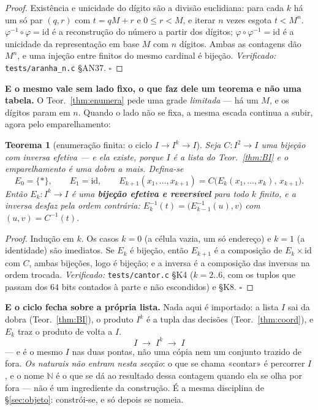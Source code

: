 \documentclass[11pt,a4paper]{article}
\newcommand{\code}[1]{\texttt{\small #1}}
\newtheorem{teorema}{Teorema}
\begin{document}
\begin{proof}
Existência e unicidade do dígito são a divisão euclidiana: para cada $k$ há um só
par $(q,r)$ com $t=qM+r$ e $0\le r<M$, e iterar $n$ vezes esgota $t<M^{n}$.
$\varphi^{-1}\circ\varphi=\mathrm{id}$ é a reconstrução do número a partir dos
dígitos; $\varphi\circ\varphi^{-1}=\mathrm{id}$ é a unicidade da representação em
base $M$ com $n$ dígitos. Ambas as contagens dão $M^{n}$, e uma injeção entre
finitos do mesmo cardinal é bijeção. \emph{Verificado:}
\code{tests/aranha\_n.c} §AN37. $\square$
\end{proof}

\medskip\noindent\textbf{E o mesmo vale sem lado fixo, o que faz dele um teorema e
não uma tabela.} O Teor.~\ref{thm:enumera} pede uma grade \emph{limitada} --- há um
$M$, e os dígitos param em $n$. Quando o lado não se fixa, a mesma escada continua a
subir, agora pelo emparelhamento:

\begin{teorema}[enumeração finita: o ciclo $I\to I^{k}\to I$]\label{thm:enumfin}
Seja $C\colon I^2\to I$ uma bijeção com inversa efetiva --- e ela existe, porque
$I$ é a lista do Teor.~\ref{thm:BI} e o emparelhamento é uma dobra a mais. Defina-se
\[
E_0=\{\ast\},\qquad E_1=\mathrm{id},\qquad
E_{k+1}(x_1,\dots,x_{k+1})=C\bigl(E_k(x_1,\dots,x_k),\,x_{k+1}\bigr).
\]
Então $E_k\colon I^{k}\to I$ é uma \textbf{bijeção efetiva e reversível} para todo
$k$ finito, e a inversa desfaz \emph{pela ordem contrária}:
$E_k^{-1}(t)=\bigl(E_{k-1}^{-1}(u),v\bigr)$ com $(u,v)=C^{-1}(t)$.
\end{teorema}

\begin{proof}
Indução em $k$. Os casos $k=0$ (a célula vazia, um só endereço) e $k=1$ (a
identidade) são imediatos. Se $E_k$ é bijeção, então $E_{k+1}$ é a composição de
$E_k\times\mathrm{id}$ com $C$, ambas bijeções, logo é bijeção; e a inversa é a
composição das inversas na ordem trocada. \emph{Verificado:}
\code{tests/cantor.c} §K4 ($k=2..6$, com os tuplos que passam dos $64$ bits contados
à parte e não escondidos) e §K8. $\square$
\end{proof}

\medskip\noindent\textbf{E o ciclo fecha sobre a própria lista.} Nada aqui é
importado: a lista $I$ sai da dobra (Teor.~\ref{thm:BI}), o produto $I^{k}$ é a
tupla das decisões (Teor.~\ref{thm:coord}), e $E_k$ traz o produto de volta a $I$.
\[
\boxed{\;I\;\longrightarrow\;I^{k}\;\longrightarrow\;I\;}
\]
--- e é o mesmo $I$ nas duas pontas, não uma cópia nem um conjunto trazido de fora.
\emph{Os naturais não entram nesta secção}: o que se chama «contar» é percorrer $I$,
e o nome $\mathbb{N}$ é o que se dá ao resultado dessa contagem quando ela se olha
por fora --- não é um ingrediente da construção. É a mesma disciplina de
§\ref{sec:objeto}: constrói-se, e só depois se nomeia.
\end{document}
